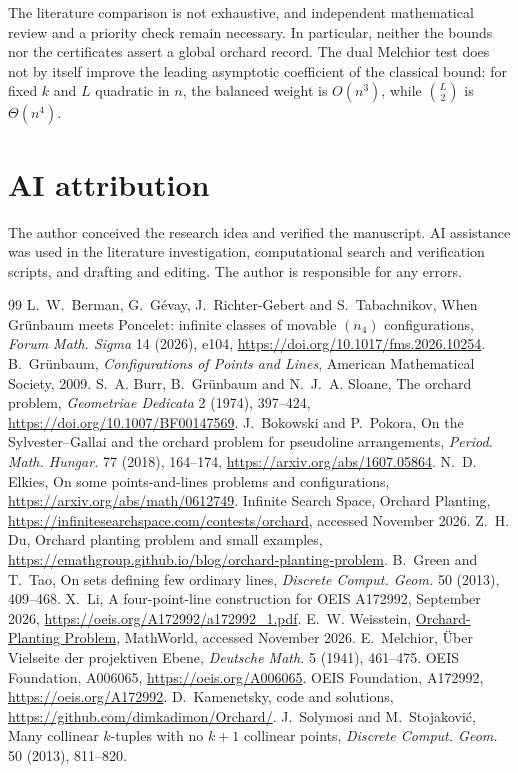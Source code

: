\documentclass[11pt,a4paper]{amsart}
\theoremstyle{remark}\newtheorem{remark}[theorem]{Remark}
\begin{document}
The literature comparison is not exhaustive, and independent mathematical review and a priority check remain necessary. In particular, neither the bounds nor the certificates assert a global orchard record. The dual Melchior test does not by itself improve the leading asymptotic coefficient of the classical bound: for fixed $k$ and $L$ quadratic in $n$, the balanced weight is $O(n^3)$, while $\binom L2$ is $\Theta(n^4)$.

\section*{AI attribution}
The author conceived the research idea and verified the manuscript. AI assistance was used in the literature investigation, computational search and verification scripts, and drafting and editing. The author is responsible for any errors.

\begin{thebibliography}{99}
 L.~W.~Berman, G.~G\'evay, J.~Richter-Gebert and S.~Tabachnikov, When Gr\"unbaum meets Poncelet: infinite classes of movable $(n_4)$ configurations, \emph{Forum Math. Sigma} 14 (2026), e104, \url{https://doi.org/10.1017/fms.2026.10254}.
 B.~Gr\"unbaum, \emph{Configurations of Points and Lines}, American Mathematical Society, 2009.
 S.~A. Burr, B.~Gr\"unbaum and N.~J.~A. Sloane, The orchard problem, \emph{Geometriae Dedicata} 2 (1974), 397--424, \url{https://doi.org/10.1007/BF00147569}.
 J.~Bokowski and P.~Pokora, On the Sylvester--Gallai and the orchard problem for pseudoline arrangements, \emph{Period. Math. Hungar.} 77 (2018), 164--174, \url{https://arxiv.org/abs/1607.05864}.
 N.~D. Elkies, On some points-and-lines problems and configurations, \url{https://arxiv.org/abs/math/0612749}.
 Infinite Search Space, Orchard Planting, \url{https://infinitesearchspace.com/contests/orchard}, accessed November 2026.
 Z.~H. Du, Orchard planting problem and small examples, \url{https://emathgroup.github.io/blog/orchard-planting-problem}.
 B.~Green and T.~Tao, On sets defining few ordinary lines, \emph{Discrete Comput. Geom.} 50 (2013), 409--468.
 X.~Li, A four-point-line construction for OEIS A172992, September 2026, \url{https://oeis.org/A172992/a172992_1.pdf}.
 E.~W. Weisstein, \href{https://mathworld.wolfram.com/Orchard-PlantingProblem.html}{Orchard-Planting Problem}, MathWorld, accessed November 2026.
 E.~Melchior, \"Uber Vielseite der projektiven Ebene, \emph{Deutsche Math.} 5 (1941), 461--475.
 OEIS Foundation, A006065, \url{https://oeis.org/A006065}.
 OEIS Foundation, A172992, \url{https://oeis.org/A172992}.
 D.~Kamenetsky, code and solutions, \url{https://github.com/dimkadimon/Orchard/}.
 J.~Solymosi and M.~Stojakovi\'c, Many collinear $k$-tuples with no $k+1$ collinear points, \emph{Discrete Comput. Geom.} 50 (2013), 811--820.
\end{thebibliography}
\end{document}
